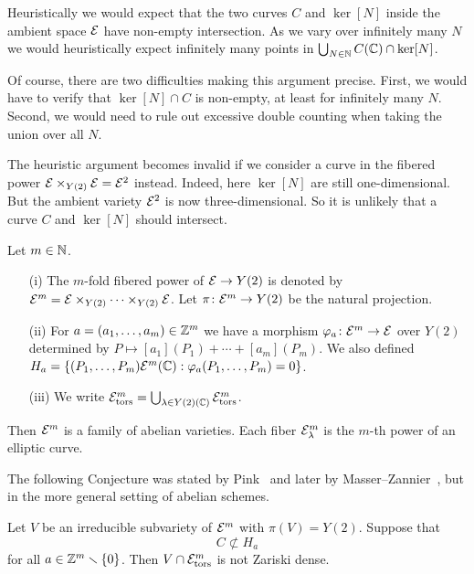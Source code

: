 \begin{example}
  Heuristically we would expect that the two curves $C$ and $\ker[N]$
  inside the ambient space ${\mathcal E}$ have non-empty intersection. As we
  vary over infinitely many $N$ we would heuristically expect
  infinitely many points in $\bigcup_{N\in{\mathbb{N}}}C({\mathbb{C}})\cap \ker[N]$.

  Of course, there are two difficulties making this  argument precise.
  First, we would have to verify that $\ker[N]\cap C$ is non-empty, at
  least for infinitely many $N$. Second, we would need to rule out
  excessive double counting when taking the union over all $N$. %

  The heuristic argument becomes invalid if we consider a curve in the
  fibered power ${\mathcal E}\times_{Y(2)} {\mathcal E} ={\mathcal E}^2$ instead. Indeed, here $\ker[N]$
  are still one-dimensional. But the ambient variety ${\mathcal E}^2$ is now
  three-dimensional. So it is unlikely that a curve $C$ and $\ker[N]$
  should intersect.
\end{example}

\begin{definition}  Let $m\in{\mathbb{N}}$.
  \begin{enumerate}
  \item [(i)] The $m$-fold fibered power of ${\mathcal E}\rightarrow Y(2)$
    is denoted by ${\mathcal E}^m = {\mathcal E}\times_{Y(2)}\cdots\times_{Y(2)}{\mathcal E}$.
    Let $\pi\colon{\mathcal E}^m\rightarrow Y(2)$ be the natural projection.
  \item[(ii)] For $a=(a_1,\ldots,a_m)\in{\mathbb{Z}}^m$ we have a morphism
    $\varphi_a \colon {\mathcal E}^m\rightarrow {\mathcal E}$ over $Y(2)$
    determined  by $P\mapsto
    [a_1](P_1)+\cdots +[a_m](P_m)$. We also defined $H_a =
    \{(P_1,\ldots,P_m) {\mathcal E}^m({\mathbb{C}}) : \varphi_a(P_1,\ldots,P_m)=0\}$. 
  \item[(iii)]  We write ${\mathcal E}^m_{\mathrm{tors}} = \bigcup_{\lambda\in Y(2)({\mathbb{C}})}
    {\mathcal E}^m_{\mathrm{tors}}$. 
  \end{enumerate}
\end{definition}

Then ${\mathcal E}^m$ is a family of abelian varieties. Each fiber
${\mathcal E}^m_\lambda$ is the $m$-th power of an elliptic curve.

The following Conjecture was stated by Pink~\cite{Pink} and later by
Masser--Zannier~\cite{MZ:AJM10}, but in the more general setting of
abelian schemes.

\begin{conjecture}
  \label{conj:relmmEm}
  Let $V$ be an irreducible subvariety of ${\mathcal E}^m$ with $\pi(V)=Y(2)$.
  Suppose that  
  \begin{equation*}
    C\not\subset H_a
  \end{equation*}
  for all $a\in{\mathbb{Z}}^{m}\smallsetminus\{0\}$.
  Then $V\cap {\mathcal E}^m_{\mathrm{tors}}$ is not Zariski dense.
\end{conjecture}



